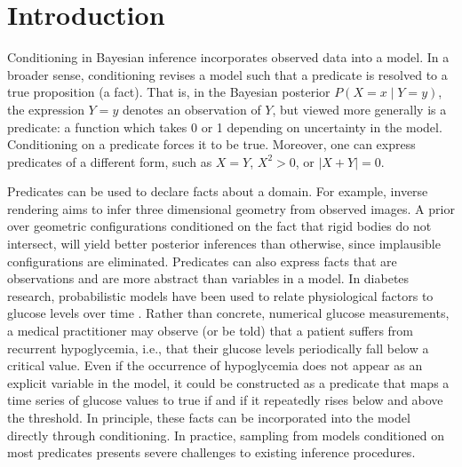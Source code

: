 
\section{Introduction}

Conditioning in Bayesian inference incorporates observed data into a model.
In a broader sense, conditioning revises a model such that a predicate is resolved to a true proposition (a fact).
That is, in the Bayesian posterior $P(X = x \mid Y = y)$, the expression $Y = y$ denotes an observation of $Y$, but viewed more generally is a predicate: a function which takes 0 or 1 depending on uncertainty in the model.
Conditioning on a predicate forces it to be true.
Moreover, one can express predicates of a different form, such as $X = Y$, $X^2 > 0$, or $|X + Y| = 0$.

Predicates can be used to declare facts about a domain. For example, inverse rendering  \cite{marschner1998inverse,kulkarni2015deep} aims to infer three dimensional geometry from observed images.
A prior over geometric configurations conditioned on the fact that rigid bodies do not intersect,  will yield better posterior inferences than otherwise, since implausible configurations are eliminated.
Predicates can also express facts that are observations and are more abstract than variables in a model.
In diabetes research, probabilistic models have been used to relate physiological factors to glucose levels over time \citep{levine2017offline,murata2004probabilistic}.
Rather than concrete, numerical glucose measurements, a medical practitioner may observe (or be told) that a patient suffers from recurrent hypoglycemia, i.e., that their glucose levels periodically fall below a critical value.
Even if the occurrence of hypoglycemia does not appear as an explicit variable in the model, it could be constructed as a predicate that maps a time series of glucose values to true if and if it repeatedly rises below and above the threshold.
In principle, these facts can be incorporated into the model directly through conditioning.	
In practice, sampling from models conditioned on most predicates presents severe challenges to existing inference procedures.


